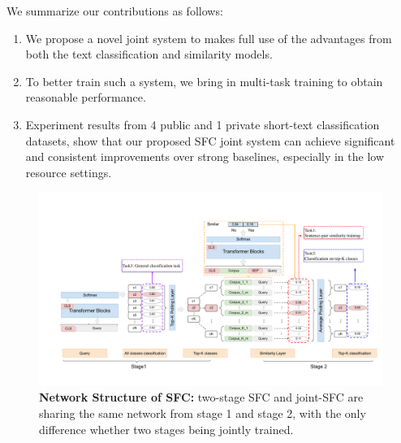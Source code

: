 We summarize our contributions as follows:
\begin{enumerate}
  \item We propose a novel joint system to makes full use of
  the advantages from both the text classification and similarity models.

  \item To  better  train such a system, we bring in multi-task training to obtain
  reasonable performance.

  \item Experiment  results  from 4 public and 1 private short-text classification
  datasets,  show  that  our  proposed  SFC joint system can achieve significant
  and consistent improvements over strong baselines, especially in the low resource settings.
\end{enumerate}

\begin{figure}[t]
  \begin{centering}
    \includegraphics[scale=0.66]{picture/picture4} 
    \par
  \end{centering}
  \caption{
    \textbf{Network Structure of SFC:} two-stage SFC and joint-SFC are sharing
    the  same  network  from  stage  1  and  stage 2, with the only difference
    whether two stages being jointly trained.
  }
  \label{fig:framework}
\end{figure}


